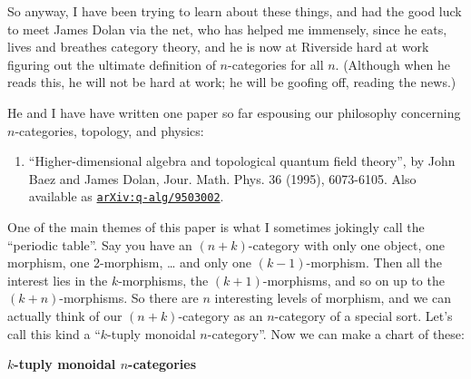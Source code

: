 \documentclass{article}
\def\tightlist{}
\begin{document}
So anyway, I have been trying to learn about these things, and had the
good luck to meet James Dolan via the net, who has helped me immensely,
since he eats, lives and breathes category theory, and he is now at
Riverside hard at work figuring out the ultimate definition of
\(n\)-categories for all \(n\). (Although when he reads this, he will
not be hard at work; he will be goofing off, reading the news.)

He and I have have written one paper so far espousing our philosophy
concerning \(n\)-categories, topology, and physics:

\begin{enumerate}
\def\labelenumi{\arabic{enumi})}
\setcounter{enumi}{1}
\tightlist
\item
  ``Higher-dimensional algebra and topological quantum field theory'',
  by John Baez and James Dolan, Jour. Math. Phys. 36 (1995), 6073-6105.
  Also available as
  \href{http://arxiv.org/abs/q-alg/9503002}{\texttt{arXiv:q-alg/9503002}}.
\end{enumerate}

One of the main themes of this paper is what I sometimes jokingly call
the ``periodic table''. Say you have an \((n+k)\)-category with only one
object, one morphism, one 2-morphism, \ldots{} and only one
\((k-1)\)-morphism. Then all the interest lies in the \(k\)-morphisms,
the \((k+1)\)-morphisms, and so on up to the \((k+n)\)-morphisms. So
there are \(n\) interesting levels of morphism, and we can actually
think of our \((n+k)\)-category as an \(n\)-category of a special sort.
Let's call this kind a ``\(k\)-tuply monoidal \(n\)-category''. Now we
can make a chart of these:

\textbf{\(k\)-tuply monoidal \(n\)-categories}
\end{document}

